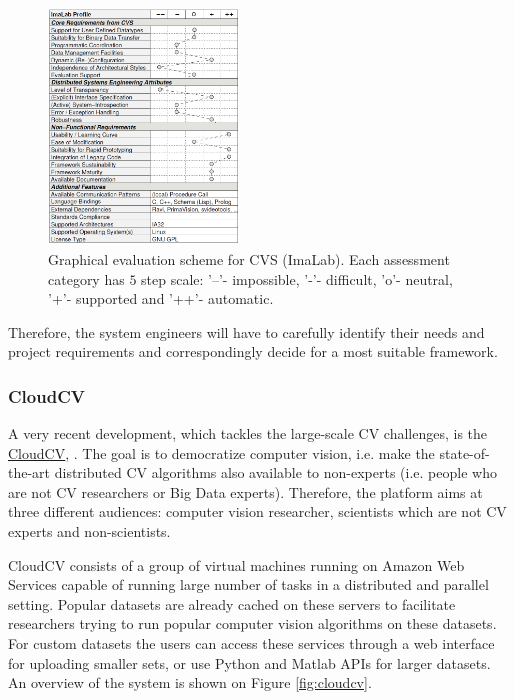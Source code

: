 \begin{figure}[H]
\begin{center}
\includegraphics[width=0.45\textwidth]{fig/CVSEval}
\end{center}
\caption{Graphical evaluation scheme for CVS (ImaLab). Each assessment category has $5$ step scale: '--'- impossible, '-'- difficult, 'o'- neutral, '+'- supported and '++'- automatic.}
\label{fig:cvseval}
\end{figure}

Therefore, the system engineers will have to carefully identify their needs and project requirements and correspondingly decide for a most suitable framework.

\subsubsection{CloudCV}
A very recent development, which tackles the large-scale CV challenges, is the \href{http://cloudcv.org/}{\underline{CloudCV}}, \cite{AgrawalMGCBMOB15}. The goal is to democratize computer vision, i.e. make the state-of-the-art distributed CV algorithms also available to non-experts (i.e. people who are not CV researchers or Big Data experts). Therefore, the platform aims at three different audiences: computer vision researcher, scientists which are not CV experts and non-scientists. 

CloudCV consists of a group of virtual machines running on Amazon
Web Services capable of running large number of tasks in a distributed and parallel
setting. Popular datasets are already cached on these servers to facilitate researchers
trying to run popular computer vision algorithms on these datasets. For custom datasets the users
can access these services through a web interface for uploading smaller sets, or use Python and Matlab APIs for larger datasets. An overview of the system is shown on Figure \ref{fig:cloudcv}.

